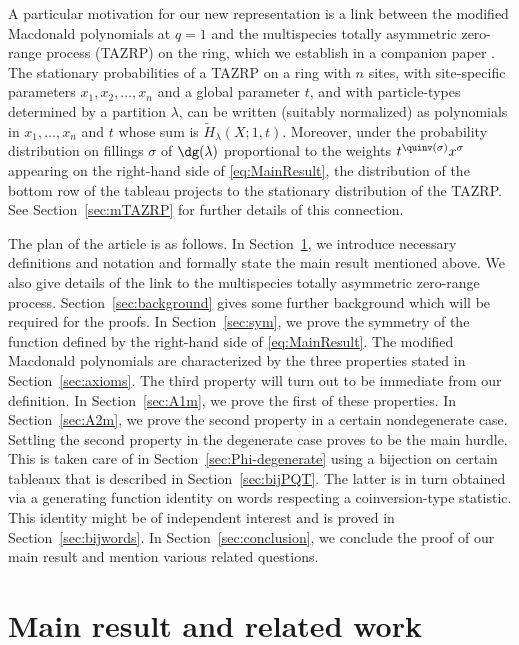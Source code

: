 A particular motivation for our new representation is a link between the modified Macdonald polynomials at $q=1$ and the multispecies totally asymmetric zero-range process (TAZRP) on the ring, which we establish in a companion paper \cite{AMM22}. 
The stationary probabilities of a TAZRP on a ring with $n$ sites, with site-specific 
parameters $x_1, x_2, \dots, x_n$ and a global parameter $t$, and with
particle-types determined by a partition $\lambda$, 
can be written (suitably normalized) as polynomials in $x_1,\dots, x_n$ and $t$ whose 
sum is $\widetilde{H}_{\lambda}(X;1,t)$. Moreover, under
the probability distribution on fillings $\sigma$ of $\dg(\lambda)$ 
proportional to the weights $t^{\quinv(\sigma)} x^\sigma$ appearing on the right-hand side
of \eqref{eq:MainResult}, the distribution of the bottom row of the tableau 
projects to the stationary distribution of the TAZRP. 
See Section~\ref{sec:mTAZRP} for further details of this connection. 


The plan of the article is as follows. In Section~\ref{sec:main}, we introduce necessary definitions and notation and formally state the main result mentioned above. We also give details of the link to the multispecies totally asymmetric zero-range process. Section~\ref{sec:background} gives some further background which will be required for the proofs. In Section~\ref{sec:sym}, we prove the symmetry of the function defined by 
the right-hand side of \eqref{eq:MainResult}. The modified Macdonald polynomials are characterized by the three properties stated in Section~\ref{sec:axioms}. The third property will turn out to be immediate from our definition. In Section~\ref{sec:A1m}, we prove the first of these properties. In Section~\ref{sec:A2m}, we prove the second property in a certain nondegenerate case. Settling the second property in the degenerate case proves to be the main hurdle. This is taken care of in Section~\ref{sec:Phi-degenerate} using a bijection on certain tableaux that is described in Section~\ref{sec:bijPQT}. The latter is in turn obtained via a generating function identity on words respecting a coinversion-type statistic. This identity might be of independent interest and is proved in Section~\ref{sec:bijwords}. In Section~\ref{sec:conclusion}, we conclude the proof of our main result and mention various related questions.

\section{Main result and related work}
\label{sec:main}

